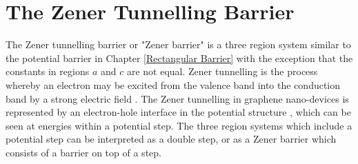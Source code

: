 %
\chapter{The Zener Tunnelling Barrier}
\label{Asymmetrical Barrier}
	The Zener tunnelling barrier or "Zener barrier" \cite{b52} is a three region system similar to the potential barrier in Chapter \ref{Rectangular Barrier} with the exception that the constants in regions $a$ and $c$ are not equal. Zener tunnelling is the process whereby an electron may be excited from the valence band into the conduction band by a strong electric field \cite{b42,b43}. The Zener tunnelling in graphene nano-devices is represented by an electron-hole interface in the potential structure \cite{b48, b54}, which can be seen at energies within a potential step. The three region systems which include a potential step can be interpreted as a double step, or as a Zener barrier which consists of a barrier on top of a step.
